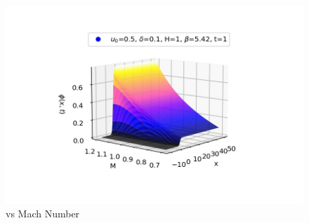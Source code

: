 \documentclass[a4paper, 12pt]{article}
\begin{document}
\begin{figure}[t]
    \centering
    \includegraphics[scale=1]{tanh_phivsV_0.jpg}
    \caption{vs Mach Number}
    \label{plot-delta}
\end{figure}
\newpage
\end{document}

